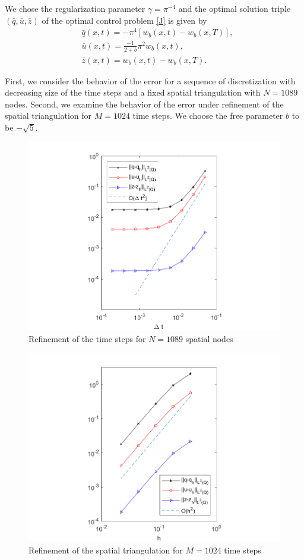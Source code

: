 We chose the regularization parameter $\gamma=\pi^{-4}$ and the optimal solution triple $(\bar{q}, \bar{u}, \bar{z})$ of the optimal control problem \eqref{J} is given by
\begin{align*}
	&\bar{q}(x, t)=-\pi^4\left[w_b(x, t)-w_b(x, T)\right],\\
	&\bar{u}(x, t)=\frac{-1}{2+b}\pi^2w_b(x, t),\\
	&\bar{z}(x, t)=w_b(x, t)-w_b(x, T).
\end{align*}

First, we consider the behavior of the error for a sequence of discretization with decreasing size of the time steps and a fixed spatial triangulation with $N=1089$ nodes. Second, we examine the behavior of the error under refinement of the spatial triangulation for $M=1024$ time steps. We choose the free parameter $b$ to be $-\sqrt{5}$.

\begin{figure}[h!]
	\centering
	\includegraphics[width=\linewidth]{figures/err_t}
	\caption{Refinement of the time steps for $N =1089$ spatial nodes}
\end{figure}

\begin{figure}[h!]
	\centering
	\includegraphics[width=\linewidth]{figures/err_x}
	\caption{Refinement of the spatial triangulation for $M = 1024$ time steps}
\end{figure}
